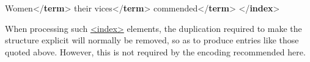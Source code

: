 \begin{shaded}
Women{</\textbf{term}>}\mbox{}\newline 
{}\mbox{}\newline 
\hspace*{1em}their vices{</\textbf{term}>}\mbox{}\newline 
\hspace*{1em}\mbox{}\newline 
\hspace*{1em}\hspace*{1em}commended{</\textbf{term}>}\mbox{}\newline 
\hspace*{1em}\mbox{}\newline 
{}\mbox{}\newline 
{</\textbf{index}>}\end{shaded}\egroup\par \par
When processing such \hyperref[TEI.index]{<index>} elements, the duplication required to make the structure explicit will normally be removed, so as to produce entries like those quoted above. However, this is not required by the encoding recommended here.\par
